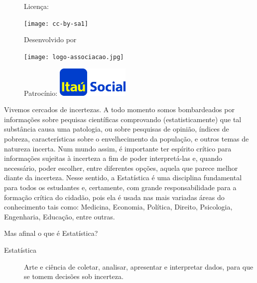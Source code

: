 \begin{figure}[b]
\begin{minipage}[l]{5cm}
\centering

{\large Licença:}

  \texttt{[image: cc-by-sa1]}
\end{minipage}\hfill
\begin{minipage}[c]{5cm}
\centering
{\large Desenvolvido por}

\texttt{[image: logo-associacao.jpg]}
\end{minipage}
\begin{minipage}[r]{5cm}
\centering

{\large Patrocínio:}
  \vspace{1em}
  \includegraphics[width=3.5cm]{itau}
\end{minipage}
\end{figure}

\mainmatter

\label{est1-exp-1}
Vivemos cercados de incertezas. A todo momento somos bombardeados por informações sobre pequisas científicas comprovando (estatisticamente) que tal substância causa uma patologia, ou sobre pesquisas de opinião, índices de pobreza, características sobre o envelhecimento da população, e outros temas de natureza incerta. Num mundo assim, é importante ter espírito crítico para informações sujeitas à incerteza a fim de poder interpretá-las e, quando necessário, poder escolher, entre diferentes opções, aquela que parece melhor diante da incerteza.  Nesse sentido, a Estatística é uma disciplina fundamental para todos os estudantes e, certamente, com grande responsabilidade para a formação crítica do cidadão, pois ela é usada nas mais variadas áreas do conhecimento tais como: Medicina, Economia, Política, Direito, Psicologia, Engenharia, Educação, entre outras.

Mas afinal o que é Estatística?
\begin{description}
\item[{Estatística}] \leavevmode{}\label{est1-def-1}
Arte e ciência de coletar, analisar, apresentar e interpretar dados, para que se tomem decisões sob incerteza.
\end{description}

